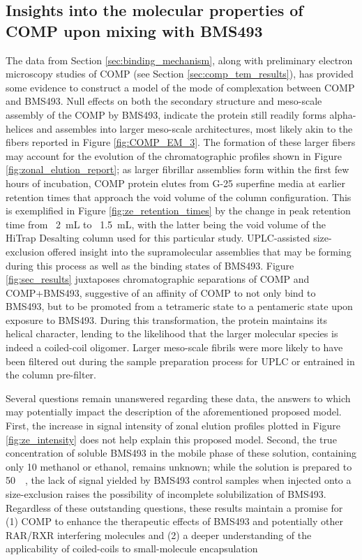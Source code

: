 \begin{refsection}
\subsection{Insights into the molecular properties of COMP upon mixing with
BMS493}
The data from Section \ref{sec:binding_mechanism}, along with preliminary
electron microscopy studies of COMP (see Section \ref{sec:comp_tem_results}),
has provided some evidence to construct a model of the mode of complexation
between COMP and BMS493. Null effects on both the secondary structure and
meso-scale assembly of the COMP by BMS493, indicate the protein still
readily forms alpha-helices and assembles into larger meso-scale
architectures, most likely akin to the fibers reported in Figure
\ref{fig:COMP_EM_3}. The formation of these larger fibers may account for the
evolution of the chromatographic profiles shown in Figure
\ref{fig:zonal_elution_report}; as larger fibrillar assemblies form within the
first few hours of incubation, COMP protein elutes from G-25 superfine media at
earlier retention times that approach the void volume of the column
configuration. This is exemplified in Figure \ref{fig:ze_retention_times} by the
change in peak retention time from ~\SI{2}{\mL} to ~\SI{1.5}{\mL}, with the latter
being the void volume of the HiTrap Desalting column used for this particular
study. UPLC-assisted size-exclusion offered insight into the supramolecular
assemblies that may be forming during this process as well as the binding states
of BMS493. Figure \ref{fig:sec_results} juxtaposes chromatographic separations of
COMP and COMP+BMS493, suggestive of an affinity of COMP to not only bind to
BMS493, but to be promoted from a tetrameric state to a pentameric state upon
exposure to BMS493. During this transformation, the protein maintains its
helical character, lending to the likelihood that the larger molecular species
is indeed a coiled-coil oligomer. Larger meso-scale fibrils were more likely to
have been filtered out during the sample preparation process for UPLC or
entrained in the column pre-filter.

Several questions remain unanswered regarding these data, the answers to which
may potentially impact the description of the aforementioned proposed model.
First, the increase in signal intensity of zonal elution profiles plotted in
Figure \ref{fig:ze_intensity} does not help explain this proposed model. Second,
the true concentration of soluble BMS493 in the mobile phase of these solution,
containing only \SI{10}{\volper} methanol or ethanol, remains unknown; while the
solution is prepared to \SI{50}{\micro\moLar}, the lack of signal yielded by
BMS493 control samples when injected onto a size-exclusion raises the
possibility of incomplete solubilization of BMS493. Regardless of these
outstanding questions, these results maintain a promise for (1) COMP to enhance
the therapeutic effects of BMS493 and potentially other RAR/RXR interfering
molecules and (2) a deeper understanding of the applicability of coiled-coils to
small-molecule encapsulation


\end{refsection}

